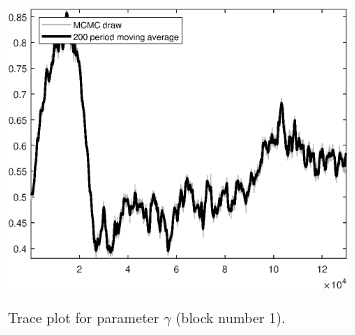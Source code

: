 \begin{figure}[H]
\centering
  \includegraphics[width=0.8\textwidth]{BRS_sectoral_wo_fixed_cost/graphs/TracePlot_gam_blck_1}\\
    \caption{Trace plot for parameter $\gamma$ (block number 1).}
\end{figure}

